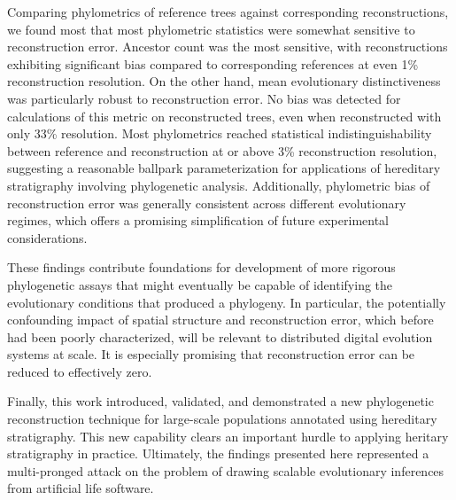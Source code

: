 Comparing phylometrics of reference trees against corresponding reconstructions, we found most that most phylometric statistics were somewhat sensitive to reconstruction error.
Ancestor count was the most sensitive, with reconstructions exhibiting significant bias compared to corresponding references at even 1\% reconstruction resolution.
On the other hand, mean evolutionary distinctiveness was particularly robust to reconstruction error.
No bias was detected for calculations of this metric on reconstructed trees, even when reconstructed with only 33\% resolution.
Most phylometrics reached statistical indistinguishability between reference and reconstruction at or above 3\% reconstruction resolution, suggesting a reasonable ballpark parameterization for applications of hereditary stratigraphy involving phylogenetic analysis.
Additionally, phylometric bias of reconstruction error was generally consistent across different evolutionary regimes, which offers a promising simplification of future experimental considerations.

These findings contribute foundations for development of more rigorous phylogenetic assays that might eventually be capable of identifying the evolutionary conditions that produced a phylogeny.
In particular, the potentially confounding impact of spatial structure and reconstruction error, which before had been poorly characterized, will be relevant to distributed digital evolution systems at scale.
It is especially promising that reconstruction error can be reduced to effectively zero.

Finally, this work introduced, validated, and demonstrated a new phylogenetic reconstruction technique for large-scale populations annotated using hereditary stratigraphy.
This new capability clears an important hurdle to applying heritary stratigraphy in practice.
Ultimately, the findings presented here represented a multi-pronged attack on the problem of drawing scalable evolutionary inferences from artificial life software.



